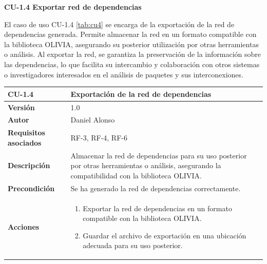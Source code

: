 \textbf{CU-1.4 Exportar red de dependencias}

El caso de uso CU-1.4 \ref{tab:cu4} se encarga de la exportación de la red de dependencias generada. Permite 
almacenar la red en un formato compatible con la biblioteca OLIVIA, asegurando su posterior utilización por 
otras herramientas o análisis. Al exportar la red, se garantiza la preservación de la información sobre las 
dependencias, lo que facilita su intercambio y colaboración con otros sistemas o investigadores interesados 
en el análisis de paquetes y sus interconexiones.

\begin{table}[p]
	\centering
	\begin{tabularx}{\linewidth}{ p{} p{} }
		\toprule
		\textbf{CU-1.4}                 & \textbf{Exportación de la red de dependencias}                                                                                                   \\
		\toprule
		\textbf{Versión}              & 1.0                                                                                                                                              \\
		\textbf{Autor}                & Daniel Alonso                                                                                                                                    \\
		\textbf{Requisitos asociados} & RF-3, RF-4, RF-6                                                                                                                                 \\
		\textbf{Descripción}          & Almacenar la red de dependencias para su uso posterior por otras herramientas o análisis, asegurando la compatibilidad con la biblioteca OLIVIA. \\
		\textbf{Precondición}         & Se ha generado la red de dependencias correctamente.                                                                                             \\
		\textbf{Acciones}             &
		\begin{enumerate}
			\def\labelenumi{\arabic{enumi}.}
			\tightlist
			\item Exportar la red de dependencias en un formato compatible con la biblioteca OLIVIA.
			\item Guardar el archivo de exportación en una ubicación adecuada para su uso posterior.
		\end{enumerate}                                                                                          \\

\end{tabularx}
\end{table}
